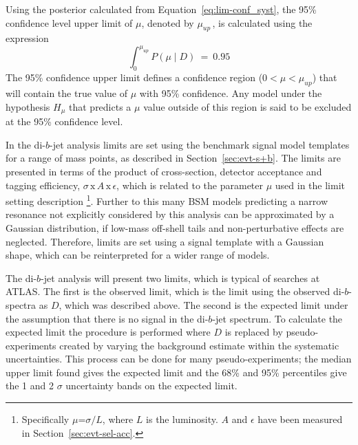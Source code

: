 Using the posterior calculated from Equation~\ref{eq:lim-conf_syst},
the 95\% confidence level upper limit of $\mu$, denoted by $\mu_{up}\,$,
is calculated using the expression
\begin{equation}
\int_0^{\mu_{up}} P(\mu \mid D)~=~0.95
\end{equation}
The 95\% confidence upper limit
defines a confidence region ($0 < \mu < \mu_{up}$)
that will contain the true value of $\mu$ with 95\% confidence.
Any model under the hypothesis $H_{\mu}$ that predicts a $\mu$
value outside of this region is said to be excluded at the 95\% confidence level.

In the di-$b$-jet analysis limits are set using the benchmark signal model templates for a range of mass points,
as described in Section~\ref{sec:evt-s+b}.
The limits are presented in terms of the product of cross-section, detector acceptance and tagging efficiency,
$\sigma\,\text{x}\,\mathit{A}\,\text{x}\,\epsilon$,
which is related to the parameter $\mu$ used in the limit setting description
\footnote{
  Specifically $\mu$=$\sigma/L$, where $L$ is the luminosity.
  $\mathit{A}$ and $\epsilon$ have been measured in Section~\ref{sec:evt-sel-acc}.
}.
Further to this
many BSM models predicting a narrow resonance
not explicitly considered by this analysis
can be approximated by a Gaussian distribution,
if low-mass off-shell tails and non-perturbative effects are neglected.
Therefore, limits are set using a signal template with a Gaussian shape,
which can be reinterpreted for a wider range of models.
  
The di-$b$-jet analysis will present two limits, which is typical of searches at ATLAS.
The first is the observed limit, which is the limit using the observed di-$b$-spectra as $D$, which was described above.
The second is the expected limit under the assumption that there is no signal in the di-$b$-jet spectrum.
To calculate the expected limit the procedure is performed where $D$ is replaced by pseudo-experiments
created by varying the background estimate within the systematic uncertainties.
This process can be done for many pseudo-experiments; the median upper limit found gives the expected limit
and the 68\% and 95\% percentiles give the 1 and 2 $\sigma$ uncertainty bands on the expected limit.

